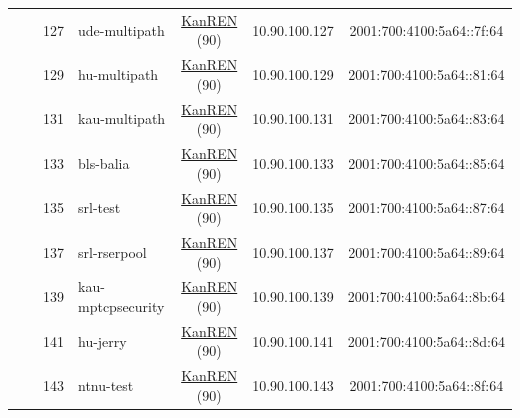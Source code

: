 \begin{small}
\begin{center}
\begin{longtable}{|c|c|c|c|c|c|c|c|}
  &  & \tiny{127} & \multicolumn{1}{|l|}{\tiny{ude-multipath}} & \multicolumn{2}{|c|}{\tiny{\href{http://www.kanren.net}{KanREN} (90)}} & \tiny{10.90.100.127} & \tiny{2001:700:4100:5a64::7f:64} \\* \cline{3-3}\cline{4-4}\cline{5-5}\cline{6-6}\cline{7-7}\cline{8-8}
  &  & \tiny{129} & \multicolumn{1}{|l|}{\tiny{hu-multipath}} & \multicolumn{2}{|c|}{\tiny{\href{http://www.kanren.net}{KanREN} (90)}} & \tiny{10.90.100.129} & \tiny{2001:700:4100:5a64::81:64} \\* \cline{3-3}\cline{4-4}\cline{5-5}\cline{6-6}\cline{7-7}\cline{8-8}
  &  & \tiny{131} & \multicolumn{1}{|l|}{\tiny{kau-multipath}} & \multicolumn{2}{|c|}{\tiny{\href{http://www.kanren.net}{KanREN} (90)}} & \tiny{10.90.100.131} & \tiny{2001:700:4100:5a64::83:64} \\* \cline{3-3}\cline{4-4}\cline{5-5}\cline{6-6}\cline{7-7}\cline{8-8}
  &  & \tiny{133} & \multicolumn{1}{|l|}{\tiny{bls-balia}} & \multicolumn{2}{|c|}{\tiny{\href{http://www.kanren.net}{KanREN} (90)}} & \tiny{10.90.100.133} & \tiny{2001:700:4100:5a64::85:64} \\* \cline{3-3}\cline{4-4}\cline{5-5}\cline{6-6}\cline{7-7}\cline{8-8}
  &  & \tiny{135} & \multicolumn{1}{|l|}{\tiny{srl-test}} & \multicolumn{2}{|c|}{\tiny{\href{http://www.kanren.net}{KanREN} (90)}} & \tiny{10.90.100.135} & \tiny{2001:700:4100:5a64::87:64} \\* \cline{3-3}\cline{4-4}\cline{5-5}\cline{6-6}\cline{7-7}\cline{8-8}
  &  & \tiny{137} & \multicolumn{1}{|l|}{\tiny{srl-rserpool}} & \multicolumn{2}{|c|}{\tiny{\href{http://www.kanren.net}{KanREN} (90)}} & \tiny{10.90.100.137} & \tiny{2001:700:4100:5a64::89:64} \\* \cline{3-3}\cline{4-4}\cline{5-5}\cline{6-6}\cline{7-7}\cline{8-8}
  &  & \tiny{139} & \multicolumn{1}{|l|}{\tiny{kau-mptcpsecurity}} & \multicolumn{2}{|c|}{\tiny{\href{http://www.kanren.net}{KanREN} (90)}} & \tiny{10.90.100.139} & \tiny{2001:700:4100:5a64::8b:64} \\* \cline{3-3}\cline{4-4}\cline{5-5}\cline{6-6}\cline{7-7}\cline{8-8}
  &  & \tiny{141} & \multicolumn{1}{|l|}{\tiny{hu-jerry}} & \multicolumn{2}{|c|}{\tiny{\href{http://www.kanren.net}{KanREN} (90)}} & \tiny{10.90.100.141} & \tiny{2001:700:4100:5a64::8d:64} \\* \cline{3-3}\cline{4-4}\cline{5-5}\cline{6-6}\cline{7-7}\cline{8-8}
  &  & \tiny{143} & \multicolumn{1}{|l|}{\tiny{ntnu-test}} & \multicolumn{2}{|c|}{\tiny{\href{http://www.kanren.net}{KanREN} (90)}} & \tiny{10.90.100.143} & \tiny{2001:700:4100:5a64::8f:64} \\* \cline{3-3}\cline{4-4}\cline{5-5}\cline{6-6}\cline{7-7}\cline{8-8}

\end{longtable}
\end{center}
\end{small}
